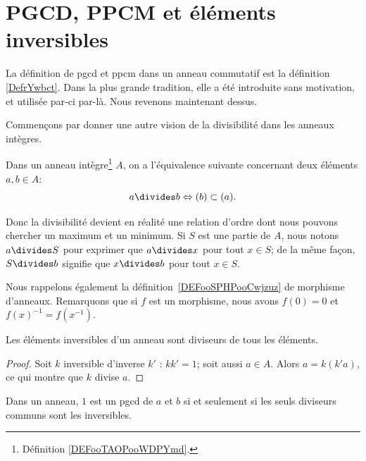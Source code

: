 \section{PGCD, PPCM et éléments inversibles}

La définition de pgcd et ppcm dans un anneau commutatif est la définition \ref{DefrYwbct}. Dans la plus grande tradition, elle a été introduite sans motivation, et utilisée par-ci par-là. Nous revenons maintenant dessus.

Commençons par donner une autre vision de la divisibilité dans les anneaux intègres.
\begin{proposition}\label{PropDiviseurIdeaux}
	Dans un anneau intègre\footnote{Définition \ref{DEFooTAOPooWDPYmd}.} \( A\), on a l'équivalence suivante concernant deux éléments \( a, b \in A \):
	\begin{equation}
		a\divides b\Leftrightarrow (b)\subset (a).
	\end{equation}
\end{proposition}

Donc la divisibilité devient en réalité une relation d'ordre dont nous pouvons chercher un maximum et un minimum. Si \( S\) est une partie de \( A\), nous notons \( a\divides S\) pour exprimer que \( a\divides x\) pour tout \( x\in S\); de la même façon, \( S\divides b\) signifie que \( x\divides b\) pour tout \( x\in S\).

Nous rappelons également la définition~\ref{DEFooSPHPooCwjzuz} de morphisme d'anneaux. Remarquons que si \( f\) est un morphisme, nous avons \( f(0)=0\) et \( f(x)^{-1}=f(x^{-1})\).

\begin{lemma}
	Les éléments inversibles d'un anneau sont diviseurs de tous les éléments.
\end{lemma}

\begin{proof}
	Soit \( k\) inversible d'inverse \( k'\) : \( kk'=1\); soit aussi \( a\in A\). Alors \( a=k(k'a)\), ce qui montre que \( k\) divise \( a\).
\end{proof}

\begin{lemma}
	Dans un anneau, \( 1\) est un pgcd de \( a\) et \( b\) si et seulement si les seuls diviseurs communs sont les inversibles.
\end{lemma}

